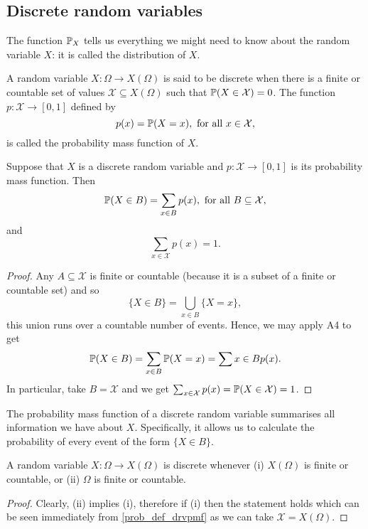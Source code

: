 \documentclass[10pt, a4paper]{article}
\begin{document}
\subsection{Discrete random variables}
The function $\P_X$ tells us everything we might need to know about the random variable $X$: it is called the distribution of $X$.

\begin{definition}\label{prob_def_drvpmf}
    A random variable $X : \Omega \rightarrow X(\Omega)$ is said to be discrete when there is a finite or countable set of values $\mathcal{X} \subseteq X(\Omega)$ such that $\P(X \in \mathcal{X}) = 0$.
    The function $p: \mathcal{X} \rightarrow [0, 1]$ defined by
    \[
    p(x) = \P(X = x),\text{ for all } x \in \mathcal{X},
    \]
    is called the probability mass function of $X$.
\end{definition}

\begin{theorem}
    Suppose that $X$ is a discrete random variable and $p : \mathcal{X} \rightarrow [0, 1]$ is its probability mass function. Then
    \[
    \P(X \in B) = \sum_{x \in B}p(x),\text{ for all } B \subseteq \mathcal{X},
    \]
    and
    \[
    \sum_{x \in \mathcal{X}}p(x) = 1.
    \]
    \begin{proof}
        Any $A \subseteq \mathcal{X}$ is finite or countable (because it is a subset of a finite or countable set) and so
        \[
        \{X \in B\} = \bigcup_{x \in B}\{X = x\},
        \]
        this union runs over a countable number of events.
        Hence, we may apply A4 to get
        \[
        \P(X \in B) = \sum_{x \in B}\P(X = x) = \sum{x \in B}p(x).
        \]
        In particular, take $B = \mathcal{X}$ and we get $\sum_{x \in \mathcal{X}}p(x) = \P(X \in \mathcal{X}) = 1$.
    \end{proof}
\end{theorem}
The probability mass function of a discrete random variable summarises all information we have about $X$.
Specifically, it allows us to calculate the probability of every event of the form $\{X \in B\}$.

\begin{theorem}
    A random variable $X : \Omega \rightarrow X(\Omega)$ is discrete whenever (i) $X(\Omega)$ is finite or countable,
    or (ii) $\Omega$ is finite or countable.
    \begin{proof}
        Clearly, (ii) implies (i),
        therefore if (i) then the statement holds which can be seen immediately from \autoref{prob_def_drvpmf} as we can take $\mathcal{X} = X(\Omega)$.
    \end{proof}
\end{theorem}
\end{document}
